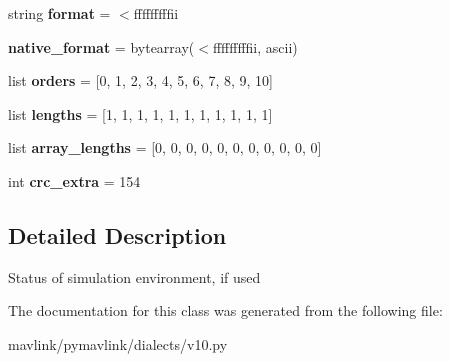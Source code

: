 \begin{DoxyCompactItemize}
\mbox{\label{classpymavlink_1_1dialects_1_1v10_1_1MAVLink__simstate__message_a36a5f57205cc619b455df911cba190fe}} 
string {\bfseries format} = \textquotesingle{}$<$fffffffffii\textquotesingle{}
\item 
\mbox{\label{classpymavlink_1_1dialects_1_1v10_1_1MAVLink__simstate__message_ae7f07062202fa4e67d678e7b699e5686}} 
{\bfseries native\+\_\+format} = bytearray(\textquotesingle{}$<$fffffffffii\textquotesingle{}, \textquotesingle{}ascii\textquotesingle{})
\item 
\mbox{\label{classpymavlink_1_1dialects_1_1v10_1_1MAVLink__simstate__message_a6be217896db3874c9afe4b8788a59c43}} 
list {\bfseries orders} = \mbox{[}0, 1, 2, 3, 4, 5, 6, 7, 8, 9, 10\mbox{]}
\item 
\mbox{\label{classpymavlink_1_1dialects_1_1v10_1_1MAVLink__simstate__message_a9d002a5769aa763ab439d0db94d6e526}} 
list {\bfseries lengths} = \mbox{[}1, 1, 1, 1, 1, 1, 1, 1, 1, 1, 1\mbox{]}
\item 
\mbox{\label{classpymavlink_1_1dialects_1_1v10_1_1MAVLink__simstate__message_a1efc8ab91f3029796dcf83737cbd70f1}} 
list {\bfseries array\+\_\+lengths} = \mbox{[}0, 0, 0, 0, 0, 0, 0, 0, 0, 0, 0\mbox{]}
\item 
\mbox{\label{classpymavlink_1_1dialects_1_1v10_1_1MAVLink__simstate__message_ac9616a05c2ffe49661331da459042d8d}} 
int {\bfseries crc\+\_\+extra} = 154
\end{DoxyCompactItemize}


\subsection{Detailed Description}
\begin{DoxyVerb}Status of simulation environment, if used
\end{DoxyVerb}
 

The documentation for this class was generated from the following file\+:\begin{DoxyCompactItemize}
\item 
mavlink/pymavlink/dialects/v10.\+py\end{DoxyCompactItemize}
